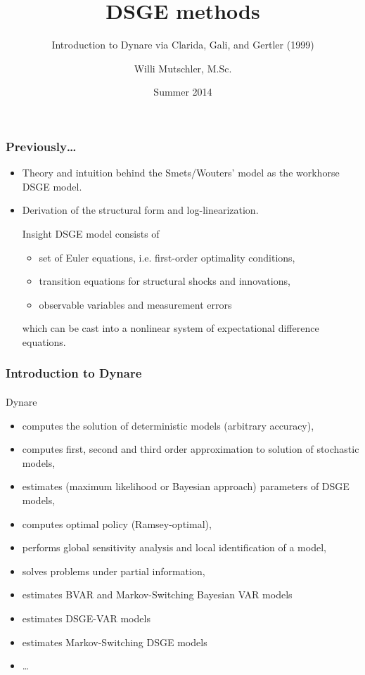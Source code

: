 \documentclass[handout]{beamer}  %
\begin{document}
\author[Willi Mutschler]{Willi Mutschler, M.Sc.}
\date{Summer 2014}
\title[DSGE methods]{DSGE methods}
\subtitle{Introduction to Dynare via Clarida, Gali, and Gertler (1999)}

\begin{frame}
\titlepage
\end{frame}

\begin{frame}\frametitle{Previously\dots}
\begin{itemize}[<+->]
  \item Theory and intuition behind the Smets/Wouters' model as the workhorse DSGE model.
  \item Derivation of the structural form and log-linearization.
\begin{block}{Insight}
DSGE model consists of
\begin{itemize}
     \item set of Euler equations, i.e. first-order optimality conditions,
     \item transition equations for structural shocks and innovations,
     \item observable variables and measurement errors
\end{itemize}
which can be cast into a nonlinear system of expectational difference equations.
\end{block}
\end{itemize}
\end{frame}

\begin{frame}
\frametitle{Introduction to Dynare}\framesubtitle{}
Dynare
\begin{itemize}
  \item computes the solution of deterministic models (arbitrary accuracy),
  \item computes first, second and third order approximation to solution of stochastic models,
  \item estimates (maximum likelihood or Bayesian approach) parameters of DSGE models,
  \item computes optimal policy (Ramsey-optimal),
  \item performs global sensitivity analysis and local identification of a model,
  \item solves problems under partial information,
  \item estimates BVAR and Markov-Switching Bayesian VAR models
  \item estimates DSGE-VAR models
  \item estimates Markov-Switching DSGE models
  \item \dots
\end{itemize}
\end{frame}
\end{document}
